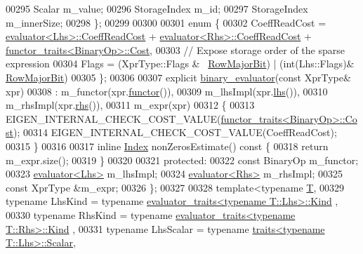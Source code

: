 \begin{DoxyCode}
00295     Scalar m\_value;
00296     StorageIndex m\_id;
00297     StorageIndex m\_innerSize;
00298   \};
00299 
00300 
00301   \textcolor{keyword}{enum} \{
00302     CoeffReadCost = \hyperlink{struct_eigen_1_1internal_1_1evaluator}{evaluator<Lhs>::CoeffReadCost} + 
      \hyperlink{struct_eigen_1_1internal_1_1evaluator}{evaluator<Rhs>::CoeffReadCost} + 
      \hyperlink{struct_eigen_1_1internal_1_1functor__traits}{functor\_traits<BinaryOp>::Cost},
00303     \textcolor{comment}{// Expose storage order of the sparse expression}
00304     Flags = (XprType::Flags & ~\hyperlink{group__flags_gae4f56c2a60bbe4bd2e44c5b19cbe8762}{RowMajorBit}) | (\textcolor{keywordtype}{int}(Lhs::Flags)&
      \hyperlink{group__flags_gae4f56c2a60bbe4bd2e44c5b19cbe8762}{RowMajorBit})
00305   \};
00306 
00307   \textcolor{keyword}{explicit} \hyperlink{struct_eigen_1_1internal_1_1binary__evaluator}{binary\_evaluator}(\textcolor{keyword}{const} XprType& xpr)
00308     : m\_functor(xpr.\hyperlink{group___core___module_acc4efe306adbdc0c95cc1c73a8cf81e4}{functor}()),
00309       m\_lhsImpl(xpr.\hyperlink{group___core___module_a0f73e7585dfb54d41c1983e1e6a4b269}{lhs}()),
00310       m\_rhsImpl(xpr.\hyperlink{group___core___module_a3a61cbdf6d1adaa62f012045b04b6d09}{rhs}()),
00311       m\_expr(xpr)
00312   \{
00313     EIGEN\_INTERNAL\_CHECK\_COST\_VALUE(\hyperlink{struct_eigen_1_1internal_1_1functor__traits}{functor\_traits<BinaryOp>::Cost});
00314     EIGEN\_INTERNAL\_CHECK\_COST\_VALUE(CoeffReadCost);
00315   \}
00316 
00317   \textcolor{keyword}{inline} \hyperlink{namespace_eigen_a62e77e0933482dafde8fe197d9a2cfde}{Index} nonZerosEstimate()\textcolor{keyword}{ const }\{
00318     \textcolor{keywordflow}{return} m\_expr.size();
00319   \}
00320 
00321 \textcolor{keyword}{protected}:
00322   \textcolor{keyword}{const} BinaryOp m\_functor;
00323   \hyperlink{struct_eigen_1_1internal_1_1evaluator}{evaluator<Lhs>} m\_lhsImpl;
00324   \hyperlink{struct_eigen_1_1internal_1_1evaluator}{evaluator<Rhs>} m\_rhsImpl;
00325   \textcolor{keyword}{const} XprType &m\_expr;
00326 \};
00327 
00328 \textcolor{keyword}{template}<\textcolor{keyword}{typename} \hyperlink{group___sparse_core___module}{T},
00329          \textcolor{keyword}{typename} LhsKind   = \textcolor{keyword}{typename} \hyperlink{struct_eigen_1_1internal_1_1_index_based}{evaluator\_traits<typename T::Lhs>::Kind}
      ,
00330          \textcolor{keyword}{typename} RhsKind   = \textcolor{keyword}{typename} \hyperlink{struct_eigen_1_1internal_1_1_index_based}{evaluator\_traits<typename T::Rhs>::Kind}
      ,
00331          \textcolor{keyword}{typename} LhsScalar = \textcolor{keyword}{typename} \hyperlink{struct_eigen_1_1internal_1_1traits}{traits<typename T::Lhs>::Scalar},

\end{DoxyCode}
